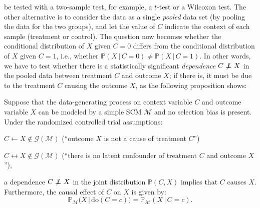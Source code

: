 \documentclass[twoside,11pt]{article}
\DeclareMathOperator*{\nCI}{{\,\not\mkern-1mu\perp\mkern-12mu\perp\,}}
\newcommand{\Prb}{\mathbb{P}}
\newcommand\C[1]{\mathcal{#1}}
\newcommand\given{\,|\,}
\newcommand{\ot}{\leftarrow}
\newcommand{\oto}{\leftrightarrow}
\newcommand{\intervene}{\mathrm{do}}
\newcommand{\Joris}[1]{{\color{blue}#1}}
\begin{document}
be tested with a two-sample test, for example, a $t$-test or a Wilcoxon test. 
The other alternative is to consider the data as a single \emph{pooled} data set 
(by pooling the data for the two groups), and let the value of $C$ indicate the
context of each sample (treatment or control). The question now becomes whether the
conditional distribution of $X$ given $C=0$ differs from the conditional distribution
of $X$ given $C=1$, i.e., whether $\Prb(X \given C=0) \ne \Prb(X \given C=1)$. 
In other words, we have to test whether
there is a statistically significant \emph{dependence} $C \nCI X$ in the pooled data 
between treatment $C$ and outcome $X$; if there is, it must be due
to the treatment $C$ causing the outcome $X$, as the following proposition shows:
\begin{proposition}\label{prop:RCT}
Suppose that the data-generating process on context variable $C$ and outcome variable $X$ 
can be modeled by a simple SCM $\C{M}$ and no selection bias is present. 
Under the randomized controlled trial assumptions:
  \begin{compactenum}[(i)]
  \item $C \ot X \notin \C{G}(\C{M})$ (``outcome $X$ is not a cause of treatment $C$'')
  \item $C \oto X \notin \C{G}(\C{M})$ (``there is no latent confounder of treatment $C$ and outcome $X$''),
  \end{compactenum}
a dependence $C \nCI X$ in the joint distribution $\Prb(C,X)$ implies that $C$ causes $X$. Furthermore,
the causal effect of $C$ on $X$ is given by:
  \begin{equation}\label{eq:RCT_causal_effect}
    \Prb_{\C{M}}\big(X \given \intervene(C=c)\big) = \Prb_{\C{M}}(X \given C=c).
  \end{equation}
\end{proposition}
\end{document}
